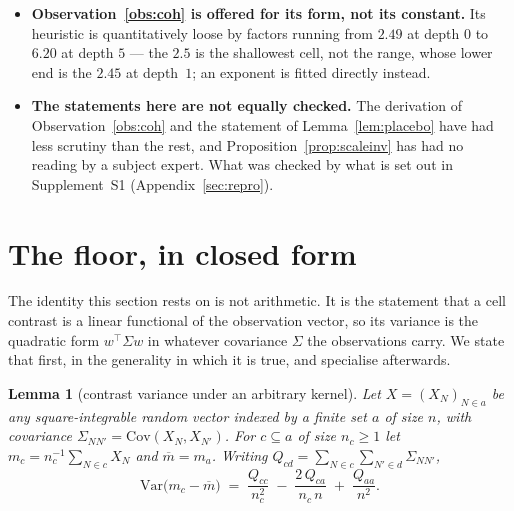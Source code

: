 \documentclass[11pt,a4paper]{article}
\theoremstyle{plain}
\newtheorem{lemma}[theorem]{Lemma}
\theoremstyle{definition}
\theoremstyle{remark}
\begin{document}
\begin{itemize}
$D_c$ moves by a factor $68$, and the correlation $0.9805$ carries an exact enumeration over
all $720$ relabellings as its control. That is one octave read across depths.
Read across scale instead, the same ratio drifts by about half as much
again (Measurement~\ref{meas:Dc}), so what is measured is a depth profile at
a fixed scale and $D_c$ is not all of what fixes the size.
\eqref{eq:JKJ} is a difference of three means and not of two, and
Measurement~\ref{meas:Dc} records what dropping the third would cost.
\item \textbf{Observation~\ref{obs:coh} is offered for its form, not
its constant.} Its heuristic is quantitatively loose by factors
running from $2.49$ at depth $0$ to $6.20$ at depth $5$ --- the $2.5$
is the shallowest cell, not the range, whose lower end is the $2.45$
at depth~$1$; an exponent is fitted
directly instead.

\item \textbf{The statements here are not equally checked.} The
derivation of Observation~\ref{obs:coh} and the statement of
Lemma~\ref{lem:placebo} have had less scrutiny than the rest, and
Proposition~\ref{prop:scaleinv} has had no reading by a subject
expert. What was checked by what is set out in Supplement~S1
(Appendix~\ref{sec:repro}).
\end{itemize}

\section{The floor, in closed form}\label{sec:floor}

The identity this section rests on is not arithmetic. It is the
statement that a cell contrast is a linear functional of the observation
vector, so its variance is the quadratic form $w^{\!\top}\Sigma w$ in
whatever covariance $\Sigma$ the observations carry. We state that first,
in the generality in which it is true, and specialise afterwards.

\begin{lemma}[contrast variance under an arbitrary kernel]\label{lem:contrast}
Let $X=(X_N)_{N\in a}$ be any square-integrable random vector indexed by
a finite set $a$ of size $n$, with covariance
$\Sigma_{NN'}=\mathrm{Cov}(X_N,X_{N'})$. For $c\subseteq a$ of size
$n_c\ge1$ let $m_c=n_c^{-1}\sum_{N\in c}X_N$ and
$\overline m=m_a$. Writing
$Q_{cd}=\sum_{N\in c}\sum_{N'\in d}\Sigma_{NN'}$,
\begin{equation}\label{eq:contrast}
  \mathrm{Var}\bigl(m_c-\overline m\bigr)
  \;=\;\frac{Q_{cc}}{n_c^{2}}
  \;-\;\frac{2\,Q_{ca}}{n_c\,n}
  \;+\;\frac{Q_{aa}}{n^{2}}.
\end{equation}
\end{lemma}
\end{document}
